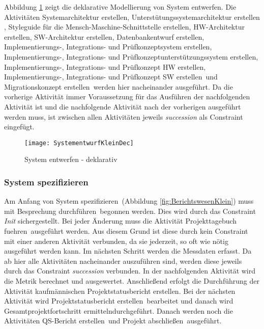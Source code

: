 {Abbildung \ref{fig:SystementwurfKleinDec} zeigt die deklarative Modellierung von \grqq System entwerfen\grqq.\newline
Die Aktivitäten \grqq Systemarchitektur erstellen\grqq,  \grqq Unterstütungssystemarchitektur erstellen \grqq,  \grqq Styleguide für die Mensch-Maschine-Schnittstelle erstellen\grqq,  \grqq HW-Architektur erstellen\grqq,  \grqq SW-Architektur erstellen\grqq,  \grqq Datenbankentwurf erstellen\grqq,  \grqq Implementierungs-, Integrations- und Prüfkonzeptsystem erstellen\grqq,  \grqq Implementierungs-, Integrations- und Prüfkonzeptunterstützungssystem erstellen\grqq,  \grqq Implementierungs-, Integrations- und Prüfkonzept HW erstellen\grqq, \grqq Implementierungs-, Integrations- und Prüfkonzept SW erstellen\grqq \ und \grqq Migrationskonzept erstellen\grqq \ werden hier nacheinander ausgeführt. Da die vorherige Aktivität immer Voraussetzung für das Ausführen der nachfolgenden Aktivität ist und die nachfolgende Aktivität nach der vorherigen ausgeführt werden muss, ist zwischen allen Aktivitäten jeweils \textit{succession} als Constraint eingefügt.

\begin{figure}[!htbp]
\begin{center}
  \texttt{[image: SystementwurfKleinDec]} %
  \caption{System entwerfen - deklarativ}
  \label{fig:SystementwurfKleinDec}
\end{center}
\end{figure}

\subsubsection{System spezifizieren}


Am Anfang von \grqq System spezifizieren\grqq \ (Abbildung \ref{fig:BerichtswesenKlein}) muss mit \grqq Besprechung durchführen\grqq \ begonnen werden. Dies wird durch das Constraint \textit{Init} sichergestellt. Bei jeder Änderung muss die Aktivität \grqq Projekttagebuch fuehren\grqq \ ausgeführt werden. Aus diesem Grund ist diese durch kein Constraint mit einer anderen Aktivität verbunden, da sie jederzeit, so oft wie nötig ausgeführt werden kann.
Im nächsten Schritt werden die \grqq Messdaten erfasst\grqq. Da ab hier alle Aktivitäten nacheinander auszuführen sind, werden diese jeweils durch das Constraint \textit{succession} verbunden.\newline
In der nachfolgenden Aktivität wird die \grqq Metrik berechnet und ausgewertet\grqq.\newline
Anschließend erfolgt die Durchführung der Aktivität \grqq kaufmännischen Projektstatusbericht erstellen\grqq.\newline
Bei der nächsten Aktivität wird \grqq Projektstatusbericht erstellen\grqq \ bearbeitet und danach wird \grqq Gesamtprojektfortschritt ermitteln\grqq durchgeführt.
Danach werden noch die Aktivitäten \grqq QS-Bericht erstellen\grqq \ und \grqq Projekt abschließen\grqq \ ausgeführt.

}
